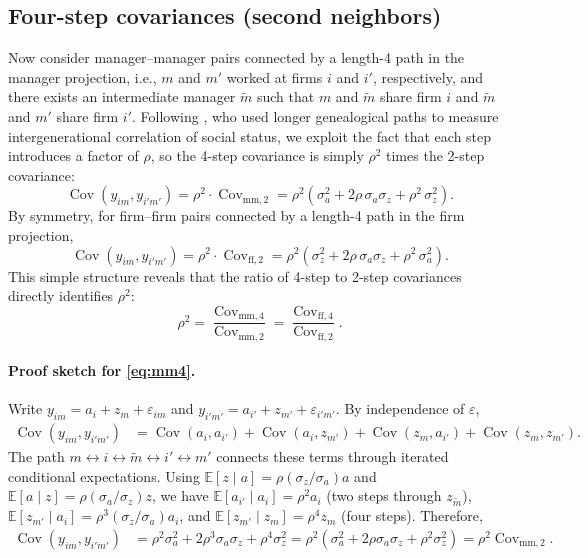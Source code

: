 \documentclass[11pt]{article}
\begin{document}
\subsection{Four-step covariances (second neighbors)}
Now consider manager--manager pairs connected by a length-4 path in the manager projection, i.e., $m$ and $m'$ worked at firms $i$ and $i'$, respectively, and there exists an intermediate manager $\tilde m$ such that $m$ and $\tilde m$ share firm $i$ and $\tilde m$ and $m'$ share firm $i'$. Following \citet{Clark2023}, who used longer genealogical paths to measure intergenerational correlation of social status, we exploit the fact that each step introduces a factor of $\rho$, so the 4-step covariance is simply $\rho^2$ times the 2-step covariance:
\begin{equation}
\label{eq:mm4}
 \operatorname{Cov}(y_{im}, y_{i'm'}) = \rho^2 \cdot \operatorname{Cov}_{\text{mm},2} = \rho^2(\sigma_a^2 + 2\rho\,\sigma_a\sigma_z + \rho^2\,\sigma_z^2).
\end{equation}
By symmetry, for firm--firm pairs connected by a length-4 path in the firm projection,
\begin{equation}
\label{eq:ff4}
 \operatorname{Cov}(y_{im}, y_{i'm'}) = \rho^2 \cdot \operatorname{Cov}_{\text{ff},2} = \rho^2(\sigma_z^2 + 2\rho\,\sigma_a\sigma_z + \rho^2\,\sigma_a^2).
\end{equation}
This simple structure reveals that the ratio of 4-step to 2-step covariances directly identifies $\rho^2$:
\begin{equation}
\label{eq:rho-ratio}
 \rho^2 = \frac{\operatorname{Cov}_{\text{mm},4}}{\operatorname{Cov}_{\text{mm},2}} = \frac{\operatorname{Cov}_{\text{ff},4}}{\operatorname{Cov}_{\text{ff},2}}.
\end{equation}

\paragraph{Proof sketch for \eqref{eq:mm4}.} Write $y_{im}=a_i+z_m+\varepsilon_{im}$ and $y_{i'm'}=a_{i'}+z_{m'}+\varepsilon_{i'm'}$. By independence of $\varepsilon$,
\begin{align*}
 \operatorname{Cov}(y_{im}, y_{i'm'}) &= \operatorname{Cov}(a_i, a_{i'}) + \operatorname{Cov}(a_i, z_{m'}) + \operatorname{Cov}(z_m, a_{i'}) + \operatorname{Cov}(z_m, z_{m'}).
\end{align*}
The path $m \leftrightarrow i \leftrightarrow \tilde m \leftrightarrow i' \leftrightarrow m'$ connects these terms through iterated conditional expectations. Using $\mathbb{E}[z\mid a] = \rho(\sigma_z/\sigma_a)a$ and $\mathbb{E}[a\mid z] = \rho(\sigma_a/\sigma_z)z$, we have $\mathbb{E}[a_{i'}\mid a_i] = \rho^2 a_i$ (two steps through $z_{\tilde m}$), $\mathbb{E}[z_{m'}\mid a_i] = \rho^3(\sigma_z/\sigma_a)a_i$, and $\mathbb{E}[z_{m'}\mid z_m] = \rho^4 z_m$ (four steps). Therefore,
\begin{align*}
 \operatorname{Cov}(y_{im}, y_{i'm'}) &= \rho^2\sigma_a^2 + 2\rho^3\sigma_a\sigma_z + \rho^4\sigma_z^2 = \rho^2(\sigma_a^2 + 2\rho\sigma_a\sigma_z + \rho^2\sigma_z^2) = \rho^2 \operatorname{Cov}_{\text{mm},2}.
\end{align*}
\end{document}
